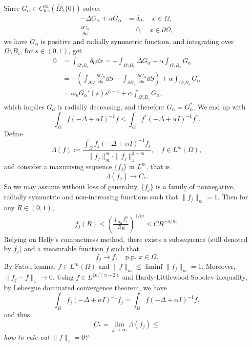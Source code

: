 Since $G_\alpha\in C^{\infty}_{\mathrm{loc}}(\overline{\Omega}\setminus\{0\})$ solves
\begin{align*}
	-\Delta G_\alpha + \alpha G_\alpha &= \delta_0, \quad x\in\Omega,\\
	\frac{\partial G_\alpha}{\partial n} &= 0,\quad x\in\partial\Omega,
\end{align*}
we have $G_\alpha$ is positive and radially symmetric function, 
and integrating over $\Omega\setminus B_s$, for $s\in(0,1)$, get 
\begin{align*}
	0 &= \int_{\Omega\setminus B_s} \delta_0\dd x 
		= - \int_{\Omega\setminus B_s} \Delta G_\alpha + \alpha\int_{\Omega\setminus B_s} G_\alpha\\
		&= -\left(\int_{\partial\Omega}\frac{\partial G_\alpha}{\partial n}\dd S 
			- \int_{\partial B_s}\frac{\partial G_\alpha}{\partial n}\dd S\right) 
			+ \alpha\int_{\Omega\setminus B_s} G_\alpha\\
		&= \omega_n G_\alpha'(s)s^{n-1} + \alpha\int_{\Omega\setminus B_s} G_\alpha,
\end{align*}  
which implies $G_\alpha$ is radially decreasing, and therefore $G_\alpha = G_\alpha^\ast$.
We end up with 
\[
\int_\Omega f(-\Delta + \alpha I)^{-1}f\leq \int_\Omega f^\ast(-\Delta +\alpha I)^{-1}f^\ast.
\]
Define 
\[
\Lambda(f) := \frac{\int_\Omega f_j(-\Delta + \alpha I)^{-1}f_j}{\|f_j\|_m^m\cdot\|f_j\|_1^{2-m}},
	\quad f\in L^m(\Omega),
\]
and consider a maximising sequence $\{f_j\}$ in $L^m$, that is
\[
\Lambda(f_j) \to C_\ast.
\]
So we may assume without loss of generality,
$\{f_j\}$ is a family of nonnegative, radially symmetric and non-increasing functions such that $\|f_j\|_m=1$. 
Then for any $R\in(0,1)$,
\begin{align*}
	f_j(R) \leq \left(\frac{\int_{B_R}f_j^m}{|B_R|}\right)^{1/m}
		\leq CR^{-n/m}.
\end{align*}
Relying on Helly's compactness method, there exists a subsequence (still denoted by $f_j$) 
and a measurable function $f$ such that 
\[
f_j \to f, \quad \text{p.p. } x\in\Omega.
\]
By Fatou lemma, $f\in L^m(\Omega)$ and $\|f\|_m\leq\liminf\|f_j\|_m = 1$. 
Moreover, $\|f_j-f\|_1 \to 0$.
Using $f\in L^{2n/(n+2)}$ and Hardy-Littlewood-Sobolev inequality, by Lebesgue dominated convergence theorem,
we have 
\[
\int_\Omega f_j(-\Delta + \alpha I)^{-1}f_j = \int_\Omega f (-\Delta + \alpha I)^{-1}f,
\]
and thus 
\[
C_\ast = \lim_{j\to\infty}\Lambda(f_j) \leq 
\]
\emph{how to rule out $\|f\|_1 = 0$?}



